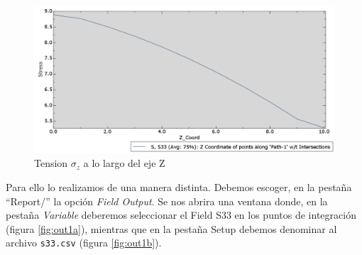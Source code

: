 \documentclass[spanish,a4paper,12pt]{article}
\begin{document}
\begin{figure}[h!tp]
\centering
\includegraphics[scale=0.45]{capturas/S-data.png}
\caption{Tension $\sigma_z$ a lo largo del eje Z}
\label{fig:Data3}%
\end{figure}

Para ello lo realizamos de una manera distinta. Debemos escoger, en la pestaña ``Report/'' la opción \emph{Field Output}. Se nos abrira una ventana donde, en la pestaña \emph{Variable} deberemos seleccionar el Field S33 en los puntos de integración (figura \ref{fig:out1a}), mientras que en la pestaña Setup debemos denominar al  archivo \texttt{s33.csv} (figura \ref{fig:out1b}).
\end{document}

